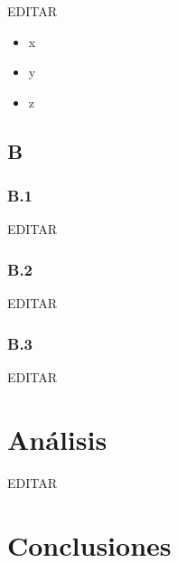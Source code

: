 \documentclass[preprint,12pt]{elsarticle}
\begin{document}
EDITAR

\begin{itemize}

\item x
\item y
\item z

\end{itemize}


\subsection{\textbf{B}}

\subsubsection{\textbf{B.1}}

EDITAR

\subsubsection{\textbf{B.2}}	

EDITAR

\subsubsection{\textbf{B.3}}	

EDITAR





\section{Análisis}

EDITAR




\section{Conclusiones}
\end{document}
